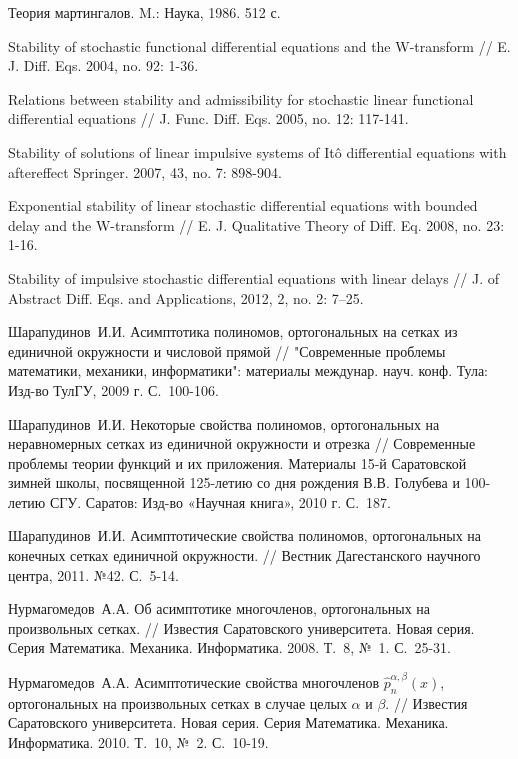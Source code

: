 \begin{thebibliography}{1}
 Теория мартингалов. M.: Наука, 1986. 512 с.

 Stability of stochastic functional differential equations and the W-transform // E. J. Diff. Eqs. 2004, no. 92: 1-36.

 Relations between stability and admissibility for stochastic linear functional differential equations // J. Func. Diff. Eqs. 2005, no. 12: 117-141.

 Stability of solutions of linear impulsive systems of Itô differential equations with aftereffect Springer. 2007, 43, no. 7: 898-904.

 Exponential stability of linear stochastic differential equations with bounded delay and the W-transform // E. J. Qualitative Theory of Diff. Eq. 2008, no. 23: 1-16.

 Stability of impulsive stochastic differential equations with linear delays // J. of Abstract Diff. Eqs. and Applications, 2012, 2, no. 2: 7–25.




{Шарапудинов~И.И.} Асимптотика полиномов, ортогональных на сетках из единичной окружности и числовой прямой // "Современные проблемы математики, механики, информатики": материалы междунар. науч. конф. Тула: Изд-во ТулГУ, 2009 г. С.~100-106.

{Шарапудинов~И.И.} Некоторые свойства полиномов, ортогональных на неравномерных сетках из единичной окружности и отрезка // Современные проблемы теории функций и их приложения. Материалы 15-й Саратовской зимней школы, посвященной 125-летию со дня рождения В.В. Голубева и 100-летию СГУ. Саратов: Изд-во «Научная книга», 2010 г. С.~187.

{Шарапудинов~И.И.} Асимптотические свойства полиномов, ортогональных на конечных сетках единичной окружности. // Вестник Дагестанского научного центра, 2011. №42. С.~5-14.

{Нурмагомедов~А.А.} Об асимптотике многочленов, ортогональных на произвольных сетках. // Известия Саратовского университета. Новая серия. Серия Математика. Механика. Информатика. 2008. Т.~8,  №~1. С.~25-31.

{Нурмагомедов~А.А.} Асимптотические свойства многочленов $\hat{p}_{n}^{\alpha,\beta}(x)$, ортогональных на произвольных сетках в случае целых $\alpha$ и $\beta$. // Известия Саратовского университета. Новая серия. Серия Математика. Механика. Информатика. 2010. Т.~10, №~2. С.~10-19.


\end{thebibliography}
